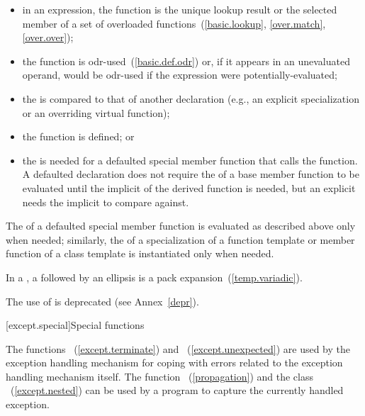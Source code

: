\begin{itemize}
\item in an expression, the function is the unique lookup result or the selected
member of a set of overloaded functions~(\ref{basic.lookup}, \ref{over.match}, \ref{over.over});

\item the function is odr-used~(\ref{basic.def.odr}) or, if it appears in an
unevaluated operand, would be odr-used if the expression were
potentially-evaluated;

\item the  is compared to that of another
declaration (e.g., an explicit specialization or an overriding virtual
function);

\item the function is defined; or

\item the  is needed for a defaulted
special member function that calls the function.
\enternote A defaulted declaration does not require the
 of a base member function to be evaluated
until the implicit  of the derived
function is needed, but an explicit  needs
the implicit  to compare against.
\exitnote
\end{itemize}

The  of a defaulted special member
function is evaluated as described above only when needed; similarly, the
 of a specialization of a function
template or member function of a class template is instantiated only when
needed.



\pnum
In a , a
 followed by an ellipsis is a
pack expansion~(\ref{temp.variadic}).

\pnum
\enternote The use of  is deprecated
(see Annex~\ref{depr}). \exitnote%

[except.special]{Special functions}

\pnum
The functions ~(\ref{except.terminate}) and
~(\ref{except.unexpected}) are used by the exception
handling mechanism for coping with errors related to the exception handling
mechanism itself. The function
~(\ref{propagation}) and the class
~(\ref{except.nested}) can be used by a program to
capture the currently handled exception.

